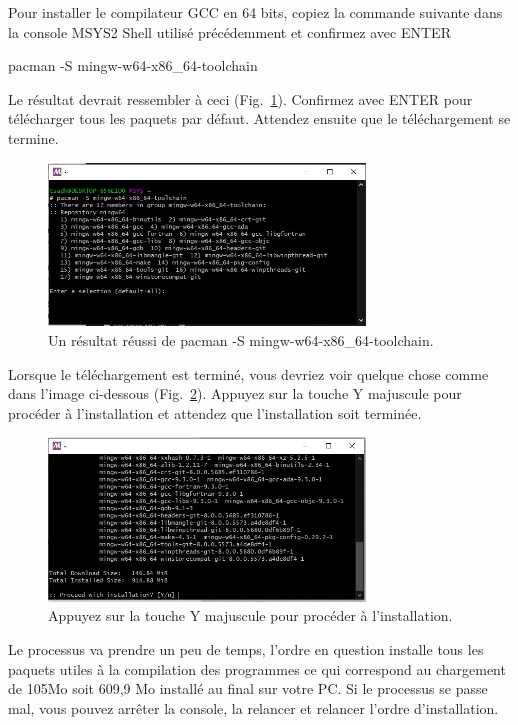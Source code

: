\documentclass{article}
\newcommand\fig[1]{{Fig.~\ref{#1}}}
\begin{document}
Pour installer le compilateur GCC en 64 bits, copiez la commande suivante dans la console MSYS2 Shell utilisé précédemment et confirmez avec ENTER 
\begin{tcolorbox}[width=\textwidth,colframe=Purple,colback={black},title={Ceci est la console MSYS2 Shell},outer arc=0mm,colupper=white]    
      pacman -S mingw-w64-x86\_64-toolchain
\end{tcolorbox}
Le résultat devrait ressembler à ceci (\fig{F:GNUInstall1}). Confirmez avec ENTER pour télécharger tous les paquets par défaut. Attendez ensuite que le téléchargement se termine.
\begin{figure}[H]
\center
\includegraphics[width=0.75\textwidth]{Plots/Msys2_11GNU.jpeg}
\caption{Un résultat réussi de pacman -S mingw-w64-x86\_64-toolchain.\label{F:GNUInstall1}}
\end{figure}
Lorsque le téléchargement est terminé, vous devriez voir quelque chose comme dans l'image ci-dessous (\fig{F:GNUInstall2}). Appuyez sur la touche Y majuscule pour procéder à l'installation et attendez que l'installation soit terminée.
\begin{figure}[H]
\center
\includegraphics[width=0.75\textwidth]{Plots/Msys2_12Gnu.jpg}
\caption{Appuyez sur la touche Y majuscule pour procéder à l'installation.\label{F:GNUInstall2}}
\end{figure}
Le processus va prendre un peu de temps, l'ordre en question installe tous les paquets utiles à la compilation des programmes ce qui correspond au chargement de 105Mo soit 609,9 Mo installé au final sur votre PC. Si le processus se passe mal, vous pouvez arrêter la console, la relancer et relancer l'ordre d'installation.
\end{document}
